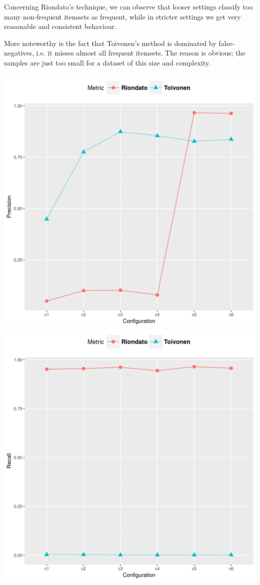 \documentclass[11pt]{sigplanconf}
\begin{document}
Concerning Riondato's technique, we can observe that looser settings classify too many non-frequent itemsets as frequent, while in stricter settings we get very reasonable and consistent behaviour.

More noteworthy is the fact that Toivonen's method is dominated by false-negatives, i.e. it misses almost all frequent itemsets. The reason is obvious; the samples are just too small for a dataset of this size and complexity.

\begin{center}
\includegraphics[width=.45\columnwidth]{kosarak.dat/precision.png}
\includegraphics[width=.45\columnwidth]{kosarak.dat/recall.png}
\end{center}
\end{document}
